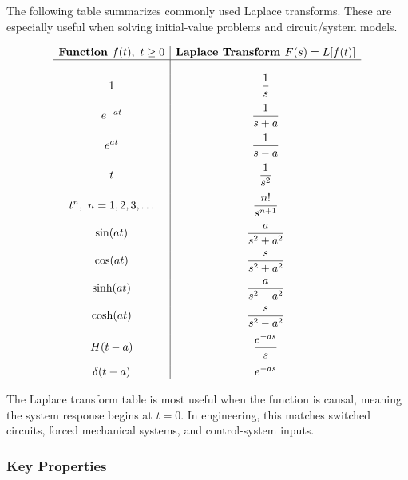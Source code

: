\begin{conceptbox}
    The following table summarizes commonly used Laplace transforms. These are especially useful when solving initial-value problems and circuit/system models.

    \[
        \begin{array}{c|c}
            \textbf{Function } f(t),\ t\geq 0 & \textbf{Laplace Transform } F(s)=L[f(t)] \\ \hline \\[1pt]
            1                                 & \dfrac{1}{s}                             \\[10pt]
            e^{-at}                           & \dfrac{1}{s+a}                           \\[10pt]
            e^{at}                            & \dfrac{1}{s-a}                           \\[10pt]
            t                                 & \dfrac{1}{s^2}                           \\[10pt]
            t^n,\ n=1,2,3,\ldots              & \dfrac{n!}{s^{n+1}}                      \\[10pt]
            \sin(at)                          & \dfrac{a}{s^2+a^2}                       \\[10pt]
            \cos(at)                          & \dfrac{s}{s^2+a^2}                       \\[10pt]
            \sinh(at)                         & \dfrac{a}{s^2-a^2}                       \\[10pt]
            \cosh(at)                         & \dfrac{s}{s^2-a^2}                       \\[10pt]
            H(t-a)                            & \dfrac{e^{-as}}{s}                       \\[10pt]
            \delta(t-a)                       & e^{-as}
        \end{array}
    \]
\end{conceptbox}

\begin{noteBox}
    The Laplace transform table is most useful when the function is causal, meaning the system response begins at $t=0$. In engineering, this matches switched circuits, forced mechanical systems, and control-system inputs.
\end{noteBox}
\subsubsection*{Key Properties}

